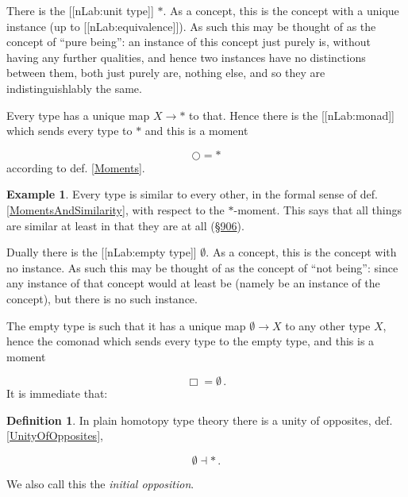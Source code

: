 \documentclass[12pt,titlepage]{article}
\theoremstyle{plain}
\theoremstyle{definition}
\newtheorem{defn}{Definition}
\newtheorem{example}{Example}
\theoremstyle{remark}
\begin{document}
There is the [[nLab:unit type]] $\ast$. As a concept, this is the concept with a unique instance (up to [[nLab:equivalence]]). As such this may be thought of as the concept of ``pure being'': an instance of this concept just purely is, without having any further qualities, and hence two instances have no distinctions between them, both just purely are, nothing else, and so they are indistinguishlably the same.

Every type has a unique map $X\to \ast$ to that. Hence there is the [[nLab:monad]] which sends every type to $\ast$ and this is a moment

\begin{displaymath}
\bigcirc = \ast
\end{displaymath}
according to def. \ref{Moments}.

\begin{example}
\label{SimilarityWithRespectToPureBeing}\hypertarget{SimilarityWithRespectToPureBeing}{}
Every type is similar to every other, in the formal sense of def. \ref{MomentsAndSimilarity}, with respect to the $\ast$-moment. This says that all things are similar at least in that they are at all (\hyperlink{906}{§906}).

\end{example}
Dually there is the [[nLab:empty type]] $\emptyset$. As a concept, this is the concept with no instance. As such this may be thought of as the concept of ``not being'': since any instance of that concept would at least be (namely be an instance of the concept), but there is no such instance.

The empty type is such that it has a unique map $\emptyset \to X$ to any other type $X$, hence the comonad which sends every type to the empty type, and this is a moment

\begin{displaymath}
\Box = \emptyset
  \,.
\end{displaymath}
It is immediate that:

\begin{defn}
\label{InitialOpposition}\hypertarget{InitialOpposition}{}
In plain homotopy type theory there is a unity of opposites, def. \ref{UnityOfOpposites},

\begin{displaymath}
\emptyset \dashv \ast
  \,.
\end{displaymath}
\end{defn}
We also call this the \emph{initial opposition}.
\end{document}
